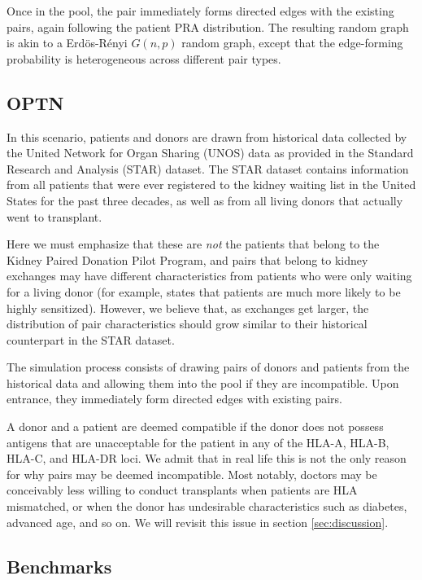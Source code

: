 \documentclass[12pt]{article}
\begin{document}
Once in the pool, the pair immediately forms directed edges with the existing pairs, again following the patient PRA distribution. The resulting random graph is akin to a Erd\"{o}s-R\'{e}nyi $G(n,p)$ random graph, except that the edge-forming probability is heterogeneous across different pair types.

\subsection{OPTN}

In this scenario, patients and donors are drawn from historical data collected by the United Network for Organ Sharing (UNOS) data as provided in the Standard Research and Analysis (STAR) dataset. The STAR dataset contains information from all patients that were ever registered to the kidney waiting list in the United States for the past three decades, as well as from all living donors that actually went to transplant. 

Here we must emphasize that these are \emph{not} the patients that belong to the Kidney Paired Donation Pilot Program, and pairs that belong to kidney exchanges may have different characteristics from patients who were only waiting for a living donor (for example, \cite{ashlagi2013kidney} states that patients are much more likely to be highly sensitized). However, we believe that, as exchanges get larger, the distribution of pair characteristics should grow similar to their historical counterpart in the STAR dataset. 

The simulation process consists of drawing pairs of donors and patients from the historical data and allowing them into the pool if they are incompatible. Upon entrance, they immediately form directed edges with existing pairs.

A donor and a patient are deemed compatible if the donor does not possess antigens that are unacceptable for the patient in any of the HLA-A, HLA-B, HLA-C, and HLA-DR loci. We admit that in real life this is not the only reason for why pairs may be deemed incompatible. Most notably, doctors may be conceivably less willing to conduct transplants when patients are HLA mismatched, or when the donor has undesirable characteristics such as diabetes, advanced age, and so on. We will revisit this issue in section \ref{sec:discussion}.


\subsection{Benchmarks}
\end{document}
